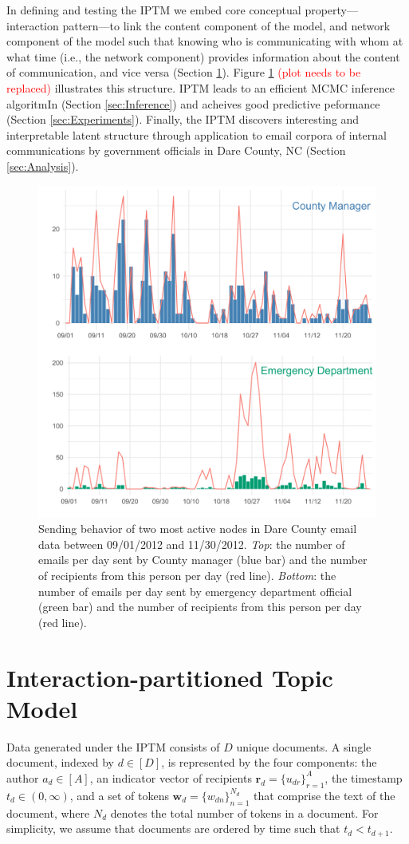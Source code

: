\documentclass{article}
\begin{document}
In defining and testing the IPTM we embed core conceptual property---interaction pattern---to link the content component of the model, and network component of the model such that knowing who is communicating with whom at what time (i.e., the network component) provides information about the content of communication, and vice versa (Section \ref{sec:model definition}). Figure \ref{fig:EDAplot} \textcolor{red}{(plot needs to be replaced)} illustrates this structure. IPTM leads to an efficient MCMC inference algoritmIn (Section \ref{sec:Inference}) and acheives good predictive peformance (Section \ref{sec:Experiments}). Finally, the IPTM discovers interesting and interpretable latent structure through application to email corpora of internal communications by government officials in Dare County, NC (Section \ref{sec:Analysis}). 
\begin{figure}[t]
	\centering
	\includegraphics[width=.48\textwidth]{plots/EDAplot.png}  
	\caption{Sending behavior of two most active nodes in Dare County email data between 09/01/2012 and 11/30/2012. \textit{Top}: the number of emails per day sent by County manager (blue bar) and the number of recipients from this person per day (red line). \textit{Bottom}: the number of emails per day sent by emergency department official (green bar) and the number of recipients from this person per day (red line).}
\label{fig:EDAplot}
\vskip -0.15in
\end{figure}
\fi
\section{Interaction-partitioned Topic Model}\label{sec:model definition}

Data generated under the IPTM consists of $D$ unique documents. A single document, indexed by $d \in [D]$, is represented by the four components: the author $a_d \in [A]$, an indicator vector of recipients $\boldsymbol{r}_d = \{u_{dr} \}_{r=1}^{A}$, the timestamp $t_d \in (0, \infty)$, and a set of tokens $\boldsymbol{w}_d= \{w_{dn} \}_{n=1}^{N_d}$ that comprise the text of the document, where $N_d$ denotes the total number of tokens in a document. For simplicity, we assume that documents are ordered by time such that $t_d < t_{d+1}$.
\end{document}
